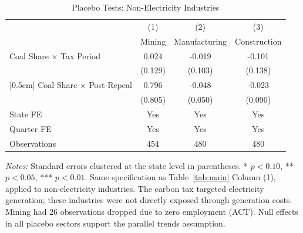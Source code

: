 \begin{table}[H]
\centering
\caption{Placebo Tests: Non-Electricity Industries}
\begin{threeparttable}
\begin{tabular}{lccc}
\toprule
 & (1) & (2) & (3) \\
 & Mining & Manufacturing & Construction \\
\midrule
Coal Share $\times$ Tax Period & 0.024 & -0.019 & -0.101 \\
 & (0.129) & (0.103) & (0.138) \\{}
[0.5em]
Coal Share $\times$ Post-Repeal & 0.796 & -0.048 & -0.023 \\
 & (0.805) & (0.050) & (0.090) \\
\midrule
State FE & Yes & Yes & Yes \\
Quarter FE & Yes & Yes & Yes \\
Observations & 454 & 480 & 480 \\
\bottomrule
\end{tabular}
\begin{tablenotes}[flushleft]
\small
\item \textit{Notes:} Standard errors clustered at the state level in parentheses. * $p<0.10$, ** $p<0.05$, *** $p<0.01$. Same specification as Table~\ref{tab:main} Column (1), applied to non-electricity industries. The carbon tax targeted electricity generation; these industries were not directly exposed through generation costs. Mining had 26 observations dropped due to zero employment (ACT). Null effects in all placebo sectors support the parallel trends assumption.
\end{tablenotes}
\end{threeparttable}
\label{tab:placebo}
\end{table}

